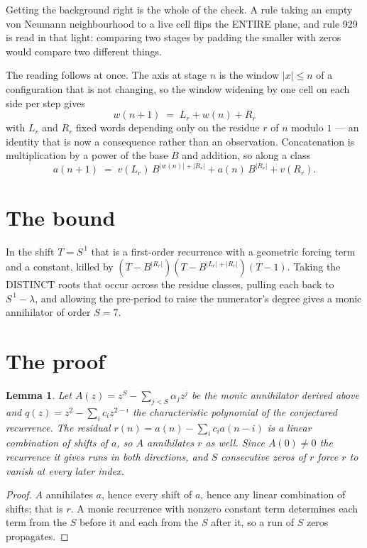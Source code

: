 \documentclass[11pt,a4paper]{article}
\theoremstyle{plain}
\newtheorem{lemma}[theorem]{Lemma}
\theoremstyle{definition}
\begin{document}
Getting the background right is the whole of the check. A rule taking an empty von Neumann
neighbourhood to a live cell flips the ENTIRE plane, and rule 929 is read
in that light: comparing two stages by padding the smaller with zeros would compare two
different things.

The reading follows at once. The axis at stage $n$ is the window $|x|\le n$ of a configuration
that is not changing, so the window widening by one cell on each side per step gives
\[
w(n+1)\;=\;L_r + w(n) + R_r
\]
with $L_r$ and $R_r$ fixed words depending only on the residue $r$ of $n$ modulo $1$ --- an
identity that is now a consequence rather than an observation. Concatenation is multiplication
by a power of the base $B$ and addition, so along a class
\[
a(n+1)\;=\;v(L_r)\,B^{|w(n)|+|R_r|} + a(n)\,B^{|R_r|} + v(R_r).
\]

\section{The bound}

In the shift $T=S^{\,1}$ that is a first-order recurrence with a geometric forcing term and a
constant, killed by $(T-B^{|R_r|})(T-B^{|L_r|+|R_r|})(T-1)$. Taking the DISTINCT roots that
occur across the residue classes, pulling each back to $S^{\,1}-\lambda$, and allowing the
pre-period to raise the numerator's degree gives a monic annihilator of order $S=7$.

\section{The proof}

\begin{lemma}\label{lem:crit}
Let $A(z)=z^S-\sum_{j<S}\alpha_jz^{j}$ be the monic annihilator derived above and
$q(z)=z^{2}-\sum_ic_iz^{2-i}$ the characteristic polynomial of the conjectured
recurrence. The residual $r(n)=a(n)-\sum_ic_ia(n-i)$ is a linear combination of shifts of $a$,
so $A$ annihilates $r$ as well. Since $A(0)\ne0$ the recurrence it gives runs in both
directions, and $S$ consecutive zeros of $r$ force $r$ to vanish at every later index.
\end{lemma}

\begin{proof}
$A$ annihilates $a$, hence every shift of $a$, hence any linear combination of shifts; that is
$r$. A monic recurrence with nonzero constant term determines each term from the $S$ before it
and each from the $S$ after it, so a run of $S$ zeros propagates.
\end{proof}
\end{document}
